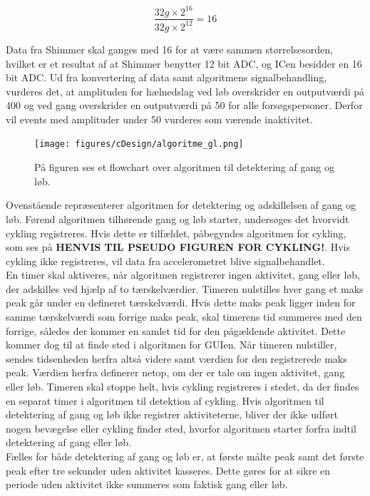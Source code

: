 \begin{equation}
\frac{32 g \times 2^{16}}{32 g \times 2^{12}} = 16
\label{eq:bitsammenhaeng}
\end{equation}

Data fra Shimmer skal ganges med 16 for at være sammen størrelsesorden, hvilket er et resultat af at Shimmer benytter 12 bit ADC, og ICen besidder en 16 bit ADC. Ud fra konvertering af data samt algoritmens signalbehandling, vurderes det, at amplituden for hælnedslag ved løb overskrider en outputværdi på 400 og ved gang overskrider en outputværdi på 50 for alle forsøgspersoner. Derfor vil events med amplituder under 50 vurderes som værende inaktivitet.
\begin{figure}[H]
	\centering
	\texttt{[image: figures/cDesign/algoritme\_gl.png]}
	\caption{På figuren ses et flowchart over algoritmen til detektering af gang og løb.}
	\label{fig:algoritme}
\end{figure}
Ovenstående  repræsenterer algoritmen for detektering og adskillelsen af gang og løb. Førend algoritmen tilhørende gang og løb starter, undersøges det hvorvidt cykling registreres. Hvis dette er tilfældet, påbegyndes algoritmen for cykling, som ses på \textbf{HENVIS TIL PSEUDO FIGUREN FOR CYKLING!}. Hvis cykling ikke registreres, vil data fra accelerometret blive signalbehandlet. \\
En timer skal aktiveres, når algoritmen registrerer ingen aktivitet, gang eller løb, der adskilles ved hjælp af to tærskelværdier. Timeren nulstilles hver gang et maks peak går under en defineret tærskelværdi. Hvis dette maks peak ligger inden for samme tærskelværdi som forrige maks peak, skal timerens tid summeres med den forrige, således der kommer en samlet tid for den pågældende aktivitet. Dette kommer dog til at finde sted i algoritmen for GUIen. Når timeren nulstiller, sendes tidsenheden herfra altså videre samt værdien for den registrerede maks peak. Værdien herfra definerer netop, om der er tale om ingen aktivitet, gang eller løb. Timeren skal stoppe helt, hvis cykling registreres i stedet, da der findes en separat timer i algoritmen til detektion af cykling. %
Hvis algoritmen til detektering af gang og løb ikke registrer aktiviteterne, bliver der ikke udført nogen bevægelse eller cykling finder sted, hvorfor algoritmen starter forfra indtil detektering af gang eller løb. \\
Fælles for både detektering af gang og løb er, at første målte peak samt det første peak efter tre sekunder uden aktivitet kasseres. Dette gøres for at sikre en periode uden aktivitet ikke summeres som faktisk gang eller løb.

